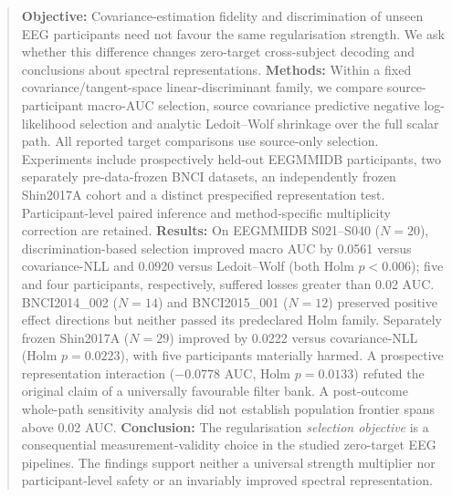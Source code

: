 \begin{abstract}
\textbf{Objective:}
Covariance-estimation fidelity and discrimination of unseen EEG participants
need not favour the same regularisation strength. We ask whether this
difference changes zero-target cross-subject decoding and conclusions about
spectral representations.
\textbf{Methods:}
Within a fixed covariance/tangent-space linear-discriminant family, we
compare source-participant macro-AUC selection, source covariance
predictive negative log-likelihood selection and analytic Ledoit--Wolf
shrinkage over the full scalar path. All reported target comparisons use
source-only selection. Experiments include prospectively held-out EEGMMIDB
participants, two separately pre-data-frozen BNCI datasets, an independently
frozen Shin2017A cohort and a distinct prespecified representation test.
Participant-level paired inference and method-specific multiplicity
correction are retained.
\textbf{Results:}
On EEGMMIDB S021--S040 (\(N=20\)), discrimination-based selection improved
macro AUC by 0.0561 versus covariance-NLL and 0.0920 versus Ledoit--Wolf
(both Holm \(p<0.006\)); five and four participants, respectively, suffered
losses greater than 0.02 AUC. BNCI2014\_002 (\(N=14\)) and BNCI2015\_001
(\(N=12\)) preserved positive effect directions but neither passed its
predeclared Holm family. Separately frozen Shin2017A (\(N=29\)) improved
by 0.0222 versus covariance-NLL (Holm \(p=0.0223\)), with five participants
materially harmed. A prospective representation interaction
(\(-0.0778\) AUC, Holm \(p=0.0133\)) refuted the original claim of a
universally favourable filter bank. A post-outcome whole-path sensitivity
analysis did not establish population frontier spans above 0.02 AUC.
\textbf{Conclusion:}
The regularisation \emph{selection objective} is a consequential
measurement-validity choice in the studied zero-target EEG pipelines.
The findings support neither a universal strength multiplier nor
participant-level safety or an invariably improved spectral representation.
\end{abstract}
